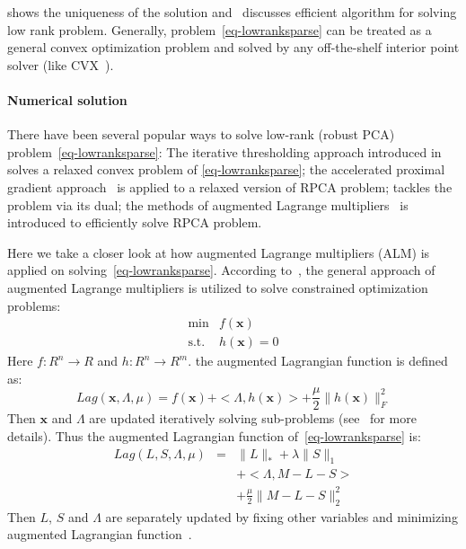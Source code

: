 \cite{candes2009exact,wright2009robust} shows the uniqueness of the solution and~\cite{lin2010augmented} discusses efficient algorithm for solving low rank problem.
Generally, problem~\ref{eq-lowranksparse} can be treated as a general convex optimization problem and solved by any off-the-shelf interior point solver (like CVX~\cite{grant2008cvx}).

\paragraph{Numerical solution}
There have been several popular ways to solve low-rank (robust PCA) problem~\eqref{eq-lowranksparse}:
The iterative thresholding approach introduced in~\cite{wright2009robust} solves a relaxed convex problem of \eqref{eq-lowranksparse};
the accelerated proximal gradient approach~\cite{beck2009fast} is applied to a relaxed version of RPCA problem;
\cite{lin2009fast} tackles the problem via its dual;
the methods of augmented Lagrange multipliers~\cite{lin2010augmented} is introduced to efficiently solve RPCA problem.

Here we take a closer look at how augmented Lagrange multipliers (ALM) is applied on solving~\eqref{eq-lowranksparse}.
According to~\cite{bertsekas1982constrained}, the general approach of augmented Lagrange multipliers is utilized to solve constrained optimization problems:
\begin{equation}
\label{eq-generalalm}
\begin{array}{cl}
\min & f(\mathbf{x})\\
\mathrm{s.t.} & h(\mathbf{x}) = 0
\end{array}
\end{equation} 
Here $f: R^n\rightarrow R$ and $h: R^n\rightarrow R^m$.
the augmented Lagrangian function is defined as:
\begin{equation}
Lag(\mathbf{x},\Lambda,\mu)=f(\mathbf{x})+<\Lambda,h(\mathbf{x})>+\frac{\mu}{2}\|h(\mathbf{x})\|_F^2
\end{equation}
Then $\mathbf{x}$ and $\Lambda$ are updated iteratively solving sub-problems (see~\cite{bertsekas1999nonlinear} for more details).
Thus the augmented Lagrangian function of~\eqref{eq-lowranksparse} is:
\begin{equation}
\label{eq-lowrankalm}
\begin{array}{ccl}
Lag(L,S,\Lambda,\mu)& =& \|L\|_* + \lambda\|S\|_1 \\
& &+ <\Lambda,M-L-S>\\
& & +\frac{\mu}{2}\|M-L-S\|_2^2
\end{array}
\end{equation}
Then $L$, $S$ and $\Lambda$ are separately updated by fixing other variables and minimizing augmented Lagrangian function~\cite{lin2010augmented}.

